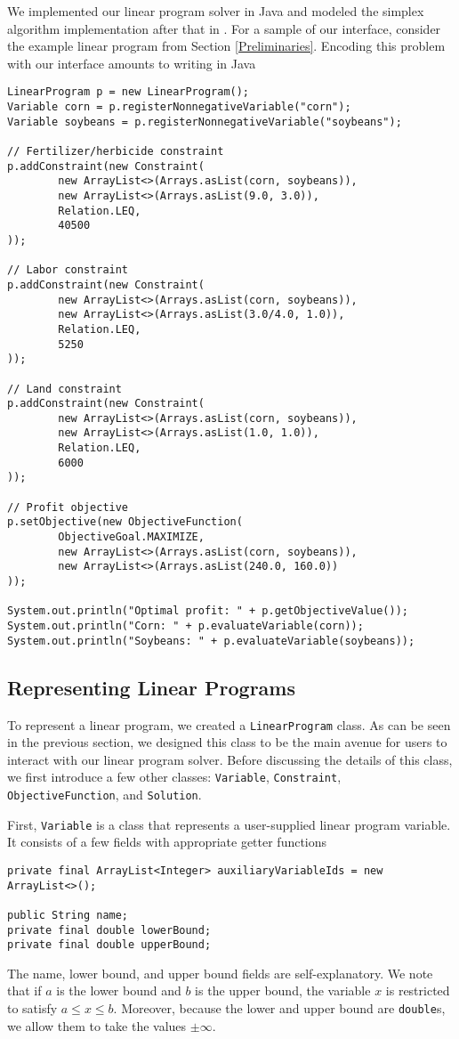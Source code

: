 \documentclass{article}
\newcommand{\javaCode}[1]{\texttt{#1}}
\begin{document}
We implemented our linear program solver in Java and modeled the simplex algorithm implementation after that in \cite{CLRS}. For a sample of our interface, consider the example linear program from Section \ref{Preliminaries}. Encoding this problem with our interface amounts to writing in Java
\begin{verbatim}
LinearProgram p = new LinearProgram();
Variable corn = p.registerNonnegativeVariable("corn");
Variable soybeans = p.registerNonnegativeVariable("soybeans");

// Fertilizer/herbicide constraint
p.addConstraint(new Constraint(
        new ArrayList<>(Arrays.asList(corn, soybeans)),
        new ArrayList<>(Arrays.asList(9.0, 3.0)),
        Relation.LEQ,
        40500
));

// Labor constraint
p.addConstraint(new Constraint(
        new ArrayList<>(Arrays.asList(corn, soybeans)),
        new ArrayList<>(Arrays.asList(3.0/4.0, 1.0)),
        Relation.LEQ,
        5250
));

// Land constraint
p.addConstraint(new Constraint(
        new ArrayList<>(Arrays.asList(corn, soybeans)),
        new ArrayList<>(Arrays.asList(1.0, 1.0)),
        Relation.LEQ,
        6000
));

// Profit objective
p.setObjective(new ObjectiveFunction(
        ObjectiveGoal.MAXIMIZE,
        new ArrayList<>(Arrays.asList(corn, soybeans)),
        new ArrayList<>(Arrays.asList(240.0, 160.0))
));

System.out.println("Optimal profit: " + p.getObjectiveValue());
System.out.println("Corn: " + p.evaluateVariable(corn));
System.out.println("Soybeans: " + p.evaluateVariable(soybeans));
\end{verbatim}

\subsection{Representing Linear Programs}
To represent a linear program, we created a \javaCode{LinearProgram} class. As can be seen in the previous section, we designed this class to be the main avenue for users to interact with our linear program solver. Before discussing the details of this class, we first introduce a few other classes: \javaCode{Variable}, \javaCode{Constraint}, \javaCode{ObjectiveFunction}, and \javaCode{Solution}.

First, \javaCode{Variable} is a class that represents a user-supplied linear program variable. It consists of a few fields with appropriate getter functions
\begin{verbatim}
private final ArrayList<Integer> auxiliaryVariableIds = new ArrayList<>();

public String name;
private final double lowerBound;
private final double upperBound;
\end{verbatim}
The name, lower bound, and upper bound fields are self-explanatory. We note that if $a$ is the lower bound and $b$ is the upper bound, the variable $x$ is restricted to satisfy $a \leq x \leq b$. Moreover, because the lower and upper bound are \javaCode{double}s, we allow them to take the values $\pm \infty$.
\end{document}
